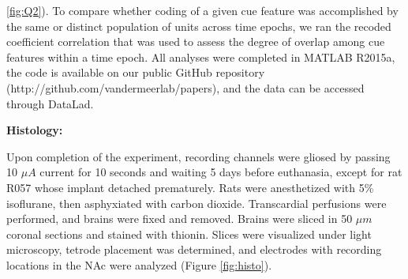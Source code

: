\documentclass[11pt]{article}
\providecommand{\DIFadd}[1]{{\protect\color{red} \sf #1}} %
\providecommand{\DIFdel}[1]{} %
\providecommand{\DIFaddbegin}{} %
\providecommand{\DIFaddend}{} %
\providecommand{\DIFdelend}{} %
\newcommand{\DIFaddincludegraphics}[2][]{{\color{red}\fbox{\DIFOincludegraphics[#1]{#2}}}} %
\DeclareRobustCommand{\DIFaddbegin}{\DIFOaddbegin \let\includegraphics\DIFaddincludegraphics} %
\DeclareRobustCommand{\DIFaddend}{\DIFOaddend \let\includegraphics\DIFOincludegraphics} %
\DeclareRobustCommand{\DIFdelend}{\DIFOaddend \let\includegraphics\DIFOincludegraphics} %
\begin{document}
\DIFdel{Given that some of our analyses compare firing rates across time ,
particularly comparisons across blocks, we sought to exclude units
with unstable firing rates that would generate spurious results
reflecting a drift in firing rate over time unrelated to our task. To
do this we ran a Mann-Whitney U test comparing the cue-evoked firing
rates for the first and second half of trials within a block, and
excluded 99 of 443 units from analysis that showed a significant change for
either block, leaving 344 units for further analyses}\DIFdelend \DIFaddbegin \DIFadd{\ref{fig:Q2}). To compare whether coding of a given cue feature was accomplished by the same or distinct population of units across time epochs, we ran the recoded coefficient correlation that was used to assess the degree of overlap among cue features within a time epoch}\DIFaddend . All analyses were completed in MATLAB R2015a, the code is available on our public GitHub repository (http://github.com/vandermeerlab/papers), and the data can be accessed through DataLad.

{\bf Histology:}

Upon completion of the experiment, recording channels were gliosed by passing 10 $\mu A$ current for 10 seconds and waiting 5 days before euthanasia, except for rat R057 whose implant detached prematurely. Rats were anesthetized with 5\%
isoflurane, then asphyxiated with carbon dioxide. Transcardial
perfusions were performed, and brains were fixed and removed. Brains
were sliced in 50 $\mu m$ coronal sections and stained with
thionin. Slices were visualized under light microscopy, tetrode
placement was determined, and electrodes with recording locations in
the NAc were analyzed (Figure \ref{fig:histo}).
\end{document}
